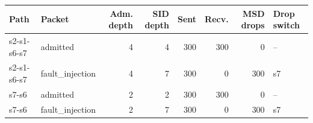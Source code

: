 \begin{tabular}{@{}llrrrrrl@{}}
\toprule
Path & Packet & Adm. depth & SID depth & Sent & Recv. & MSD drops & Drop switch \\
\midrule
s2-s1-s6-s7 & admitted & 4 & 4 & 300 & 300 & 0 & -- \\
s2-s1-s6-s7 & fault\_injection & 4 & 7 & 300 & 0 & 300 & s7 \\
s7-s6 & admitted & 2 & 2 & 300 & 300 & 0 & -- \\
s7-s6 & fault\_injection & 2 & 7 & 300 & 0 & 300 & s7 \\
\bottomrule
\end{tabular}
